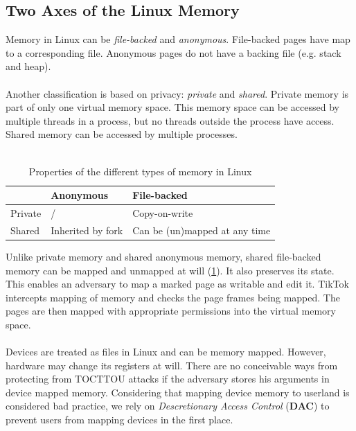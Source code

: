 \subsection{Two Axes of the Linux Memory}

Memory in Linux can be \emph{file-backed} and \emph{anonymous}. File-backed pages have map to a corresponding file. 
Anonymous pages do not have a backing file (e.g. stack and heap).
\\
\\
Another classification is based on privacy: \emph{private} and \emph{shared}. Private memory is part of only one virtual memory space.
This memory space can be accessed by multiple threads in a process, but no threads outside the process have access.
Shared memory can be accessed by multiple processes.
\\
\\
\begin{table}[]
  \begin{tabular}{|l|l|l|}
  \hline
          & Anonymous                            & File-backed                           \\ \hline
  Private & /                                    & Copy-on-write                         \\ \hline
  Shared  & Inherited by fork                    & Can be (un)mapped at any time         \\ \hline
  \end{tabular}
  \caption{Properties of the different types of memory in Linux}
  \label{tab:memory}
\end{table}
Unlike private memory and shared anonymous memory, shared file-backed memory can be mapped and unmapped at will (\cref{tab:memory}). It 
also preserves its state. This enables an adversary to map a marked page as writable and edit it. 
TikTok intercepts mapping of memory and checks the page frames being mapped. The pages are then mapped
with appropriate permissions into the virtual memory space.
\\
\\
Devices are treated as files in Linux and can be memory mapped. However, hardware may change its registers at will.
There are no conceivable ways from protecting from TOCTTOU attacks if the adversary stores his arguments in device
mapped memory. Considering that mapping device memory to userland is considered bad practice, we rely on \emph{Descretionary
Access Control} (\textbf{DAC}) to prevent users from mapping devices in the first place.

